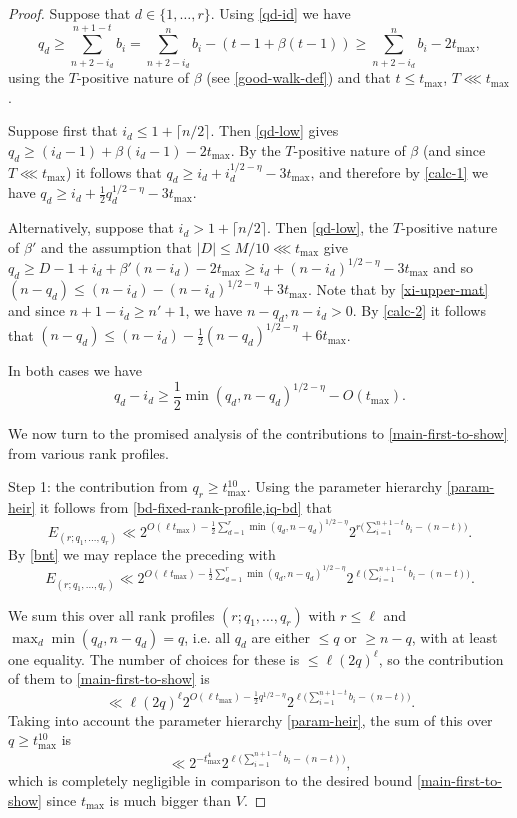 \documentclass[11pt,reqno]{amsart}
\numberwithin{equation}{section}
\theoremstyle{definition}
\theoremstyle{remark}
\renewcommand{\le}{\leqslant}
\renewcommand{\ge}{\geqslant}
\begin{document}
\begin{proof}
Suppose that $d \in \{1,\dots, r\}$. Using \cref{qd-id} we have
\begin{equation}\label{qd-low} q_d \ge \sum_{n + 2- i_d}^{n +1 - t} b_i = \sum_{n + 2- i_d}^{n} b_i - (t - 1 + \beta(t - 1)) \ge \sum_{n + 2- i_d }^{n} b_i - 2t_{\max},\end{equation}
 using the $T$-positive nature of $\beta$ (see \cref{good-walk-def}) and that $t \le t_{\max}$, $T \lll t_{\max}$.

Suppose first that $i_d \le 1 + \lceil n/2\rceil$. Then \cref{qd-low} gives $q_d \ge (i_d-1)  +\beta(i_d-1)  - 2t_{\max}$. By the $T$-positive nature of $\beta$ (and since $T \lll t_{\max}$) it follows that $q_d \ge i_d + i_d^{1/2 - \eta} - 3t_{\max}$, and therefore by \cref{calc-1} we have $q_d \ge i_d + \frac{1}{2}q_d^{1/2 - \eta} - 3t_{\max}$.

Alternatively, suppose that $i_d > 1 + \lceil n/2\rceil$. Then \cref{qd-low}, the $T$-positive nature of $\beta'$ and the assumption that $|D| \le M/10 \lll t_{\max}$ give $q_d \ge D -1 + i_d + \beta'(n - i_d) - 2t_{\max} \ge i_d + (n - i_d)^{1/2 - \eta} - 3t_{\max}$ and so $(n - q_d) \le (n - i_d) - (n - i_d)^{1/2 - \eta} + 3t_{\max}$. Note that by \cref{xi-upper-mat} and since $n + 1 - i_d \ge n' + 1$, we have $n - q_d, n-i_d > 0$. By \cref{calc-2} it follows that $(n - q_d) \le (n - i_d) - \frac{1}{2}(n - q_d)^{1/2 - \eta} + 6t_{\max}$.

In both cases we have
\begin{equation}\label{iq-bd}  q_d - i_d  \ge  \frac{1}{2}\min(q_d, n - q_d)^{1/2 - \eta} - O(t_{\max}).\end{equation} 


We now turn to the promised analysis of the contributions to \cref{main-first-to-show} from various rank profiles.\vspace*{8pt}

Step 1: the contribution from $q_r \ge t_{\max}^{10}$. Using the parameter hierarchy \cref{param-heir} it follows from \cref{bd-fixed-rank-profile,iq-bd} that
\[ E_{(r; q_1,\dots, q_r)} \ll 2^{O(\ell t_{\max}) - \frac{1}{2}\sum_{d = 1}^r \min(q_d, n - q_d)^{1/2 - \eta}}2^{r \big(\sum_{i=1}^{n + 1 - t} b_i - (n - t) \big)} .\]
By \cref{bnt} we may replace the preceding with 
\[ E_{(r; q_1,\dots, q_r)} \ll 2^{O(\ell t_{\max}) - \frac{1}{2}\sum_{d = 1}^r \min(q_d, n - q_d)^{1/2 - \eta}}2^{\ell \big(\sum_{i=1}^{n + 1 - t} b_i - (n - t) \big)} .\]

We sum this over all rank profiles $(r; q_1, \dots, q_r)$ with $r \le \ell$ and $\max_d \min(q_d, n - q_d) = q$, i.e. all $q_d$ are either $\le q$ or $\ge n - q$, with at least one equality.  The number of choices for these is $\le \ell(2q)^{\ell}$, so the contribution of them to \cref{main-first-to-show} is 
\[ \ll \ell (2q)^{\ell}  2^{O(\ell t_{\max}) - \frac{1}{2}q^{1/2 - \eta}}2^{\ell \big(\sum_{i = 1}^{n + 1 - t} b_i - (n - t) \big)}.\] Taking into account the parameter hierarchy \cref{param-heir}, the sum of this over $q \ge t_{\max}^{10}$ is 
\[ \ll 2^{-t_{\max}^4} 2^{\ell \big(\sum_{i =1}^{n + 1 - t} b_i - (n - t) \big)}
,\]
which is completely negligible in comparison to the desired bound \cref{main-first-to-show} since $t_{\max}$ is much bigger than $V$. 


\end{proof}
\end{document}
